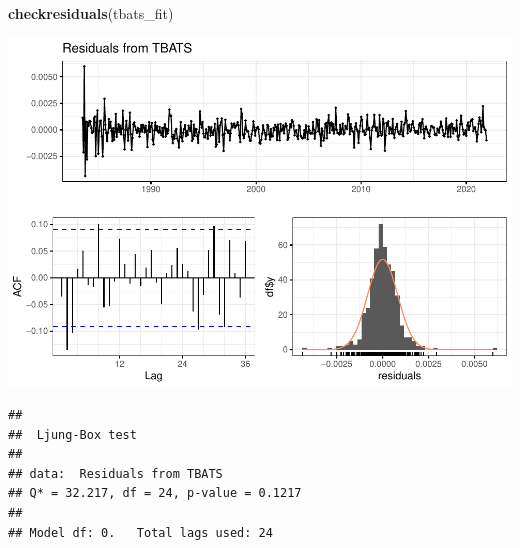 \documentclass[
]{article}
\newenvironment{Shaded}{\begin{snugshade}}{\end{snugshade}}
\newcommand{\AttributeTok}[1]{\textcolor[rgb]{0.13,0.29,0.53}{#1}}
\newcommand{\CommentTok}[1]{\textcolor[rgb]{0.56,0.35,0.01}{\textit{#1}}}
\newcommand{\FunctionTok}[1]{\textcolor[rgb]{0.13,0.29,0.53}{\textbf{#1}}}
\newcommand{\NormalTok}[1]{#1}
\newcommand{\OtherTok}[1]{\textcolor[rgb]{0.56,0.35,0.01}{#1}}
\newcommand{\SpecialCharTok}[1]{\textcolor[rgb]{0.81,0.36,0.00}{\textbf{#1}}}
\begin{document}
\begin{Shaded}
\begin{Highlighting}[]
\FunctionTok{checkresiduals}\NormalTok{(tbats\_fit)}
\end{Highlighting}
\end{Shaded}

\includegraphics{Methane_Forecasting_files/figure-latex/unnamed-chunk-13-1.pdf}

\begin{verbatim}
## 
##  Ljung-Box test
## 
## data:  Residuals from TBATS
## Q* = 32.217, df = 24, p-value = 0.1217
## 
## Model df: 0.   Total lags used: 24
\end{verbatim}

\begin{Shaded}
\end{Shaded}
\end{document}
